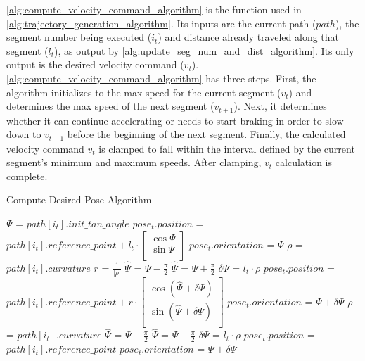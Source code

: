 \autoref{alg:compute_velocity_command_algorithm} is the \ComputeVelocityCommand function used in \autoref{alg:trajectory_generation_algorithm}. Its inputs are the current path ($path$), the segment number being executed ($i_t$) and distance already traveled along that segment ($l_t$), as output by \autoref{alg:update_seg_num_and_dist_algorithm}. Its only output is the desired velocity command ($v_t$). \autoref{alg:compute_velocity_command_algorithm} has three steps. First, the algorithm initializes to the max speed for the current segment ($v_t$) and determines the max speed of the next segment ($v_{t+1}$). Next, it determines whether it can continue accelerating or needs to start braking in order to slow down to $v_{t+1}$ before the beginning of the next segment. Finally, the calculated velocity command $v_t$ is clamped to fall within the interval defined by the current segment's minimum and maximum speeds. After clamping, $v_t$ calculation is complete.

\begin{algorithm}
\caption{Compute Desired Pose Algorithm}
\label{alg:compute_desired_pose_algorithm}
\DontPrintSemicolon


$\Psi$  = $path\left[i_t\right].init\_tan\_angle$ \;
{
	{
		$pose_t.position$ = $path\left[i_t\right].reference\_point + l_t \cdot 
			\begin{bmatrix}
				\cos \Psi \\
				\sin \Psi \\
			\end{bmatrix} $ \;
		$pose_t.orientation$  = $\Psi$ \;
	}
	{
		$\rho$ = $path\left[i_t\right].curvature$ \;
		$r$ = $\frac{1}{ | \rho | }$ \;
		{
			$\hat\Psi$ = $\Psi - \frac{\pi}{2}$ \;
		}
		{
			$\hat\Psi$ = $\Psi + \frac{\pi}{2}$ \;
		}
		$\delta\Psi$ = $l_t \cdot \rho$ \;
		$pose_t.position$ = $path\left[i_t\right].reference\_point + r \cdot 
			\begin{bmatrix}
				\cos\left( \hat\Psi + \delta\Psi \right) \\
				\sin\left( \hat\Psi + \delta\Psi \right) \\
			\end{bmatrix} $ \;
		$pose_t.orientation$  = $\Psi + \delta\Psi$ \;
	}
	{
		$\rho$ = $path\left[i_t\right].curvature$ \;
		{
			$\hat\Psi$ = $\Psi - \frac{\pi}{2}$ \;
		}
		{
			$\hat\Psi$ = $\Psi + \frac{\pi}{2}$ \;
		}
		$\delta\Psi$ = $l_t \cdot \rho$ \;
		$pose_t.position$ = $path\left[i_t\right].reference\_point$ \;
		$pose_t.orientation$  = $\Psi + \delta\Psi$ \;
	}
}

\end{algorithm}

